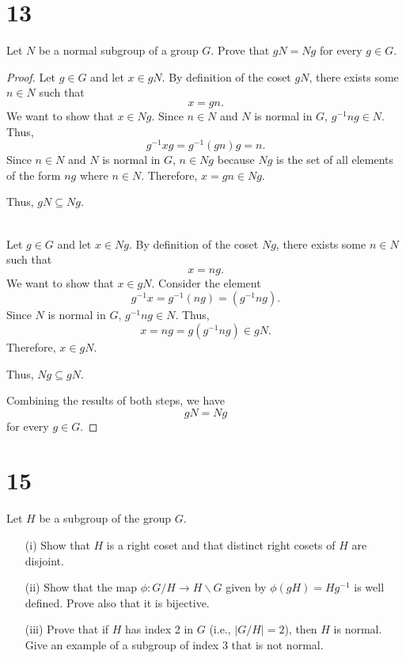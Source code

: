 \documentclass{article}
\begin{document}
\section*{13}
Let $N$ be a normal subgroup of a group $G$. Prove that $gN = Ng$ for every $g \in G$.
\begin{proof}
    Let \( g \in G \) and let \( x \in gN \). By definition of the coset \( gN \), there exists some \( n \in N \) such that
    \[
    x = gn.
    \]
    We want to show that \( x \in Ng \). Since \( n \in N \) and \( N \) is normal in \( G \), \( g^{-1}ng \in N \). Thus,
    \[
    g^{-1} x g = g^{-1} (gn) g = n.
    \]
    Since \( n \in N \) and \( N \) is normal in \( G \), \( n \in Ng \) because \( Ng \) is the set of all elements of the form \( ng \) where \( n \in N \). Therefore, \( x = gn \in Ng \).
    
    Thus, \( gN \subseteq Ng \).
    
\leavevmode \\     
    Let \( g \in G \) and let \( x \in Ng \). By definition of the coset \( Ng \), there exists some \( n \in N \) such that
    \[
    x = ng.
    \]
    We want to show that \( x \in gN \). Consider the element
    \[
    g^{-1} x = g^{-1} (ng) = (g^{-1}n g).
    \]
    Since \( N \) is normal in \( G \), \( g^{-1}n g \in N \). Thus,
    \[
    x = ng = g(g^{-1}n g) \in gN.
    \]
    Therefore, \( x \in gN \).
    
    Thus, \( Ng \subseteq gN \).
    
    Combining the results of both steps, we have
    \[
    gN = Ng
    \]
    for every \( g \in G \).\end{proof}


\section*{15}
Let $H$ be a subgroup of the group $G$.
\begin{enumerate}
    \item[(i)] Show that $H$ is a right coset and that distinct right cosets of $H$ are disjoint.
    \item[(ii)] Show that the map $\phi: G/H \to H\backslash G$ given by $\phi(gH) = Hg^{-1}$ is well defined. Prove also that it is bijective.
    \item[(iii)] Prove that if $H$ has index 2 in $G$ (i.e., $|G/H| = 2$), then $H$ is normal. Give an example of a subgroup of index 3 that is not normal.
\end{enumerate}
\end{document}
